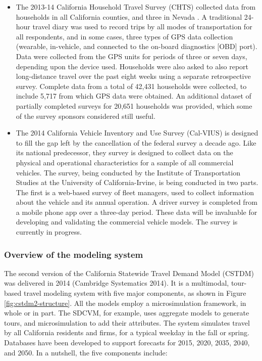 \begin{itemize}
\item
The 2013-14 California Household Travel Survey (CHTS) collected data from households in all California counties, and three in Nevada \citep{nustats13}. A traditional 24-hour travel diary was used to record trips by all modes of transportation for all respondents, and in some cases, three types of GPS data collection (wearable, in-vehicle, and connected to the on-board diagnostics {[}OBD{]} port). Data were collected from the GPS units for periods of three or seven days, depending upon the device used. Households were also asked to also report long-distance travel over the past eight weeks using a separate retrospective survey. Complete data from a total of 42,431 households were collected, to include 5,717 from which GPS data were obtained. An additional dataset of partially completed surveys for 20,651 households was provided, which some of the survey sponsors considered still useful.
\item
The 2014 California Vehicle Inventory and Use Survey (Cal-VIUS) is designed to fill the gap left by the cancellation of the federal survey a decade ago. Like its national predecessor, they survey is designed to collect data on the physical and operational characteristics for a sample of all commercial vehicles. The survey, being conducted by the Institute of Transportation Studies at the University of California-Irvine, is being conducted in two parts. The first is a web-based survey of fleet managers, used to collect information about the vehicle and its annual operation. A driver survey is completed from a mobile phone app over a three-day period. These data will be invaluable for developing and validating the commercial vehicle models. The survey is currently in progress.
\end{itemize}

\subsubsection{Overview of the modeling system}

The second version of the California Statewide Travel Demand Model (CSTDM) was delivered in 2014 (Cambridge Systematics 2014). It is a multimodal, tour-based travel modeling system with five major components, as shown in Figure \ref{fig:cstdm2-structure}. All the models employ a microsimulation framework, in whole or in part. The SDCVM, for example, uses aggregate models to generate tours, and microsimulation to add their attributes. The system simulates travel by all California residents and firms, for a typical weekday in the fall or spring. Databases have been developed to support forecasts for 2015, 2020, 2035, 2040, and 2050. In a nutshell, the five components include:

